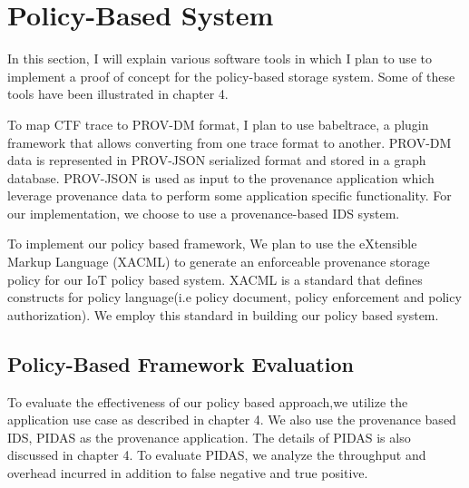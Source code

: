 \section{Policy-Based System}

In this section, I will explain various software tools in which I plan to use to implement a proof of concept for the policy-based storage system. Some of these tools have been illustrated in chapter 4. 


\par To map CTF trace to PROV-DM format, I plan to use babeltrace, a plugin framework that allows converting from one trace format to another. PROV-DM data is represented in PROV-JSON serialized format and stored in a graph database. PROV-JSON is used as input to the provenance application which leverage provenance data to perform some application specific functionality. For our implementation, we choose to use a provenance-based IDS system.


To implement our policy based framework, We plan to use the eXtensible Markup Language (XACML)  \cite{xacml} to generate an enforceable provenance storage policy for our IoT policy based system. XACML is a standard that defines constructs for policy language(i.e policy document, policy enforcement and policy authorization). We employ this standard in building our policy based system.


\subsection{Policy-Based Framework Evaluation}

To evaluate the effectiveness of our policy based approach,we utilize the application use case as described in chapter 4. We also use the provenance based IDS, PIDAS as the provenance application. The details of PIDAS is also discussed in chapter 4. To evaluate PIDAS, we analyze the throughput and overhead incurred in addition to false negative and true positive.







